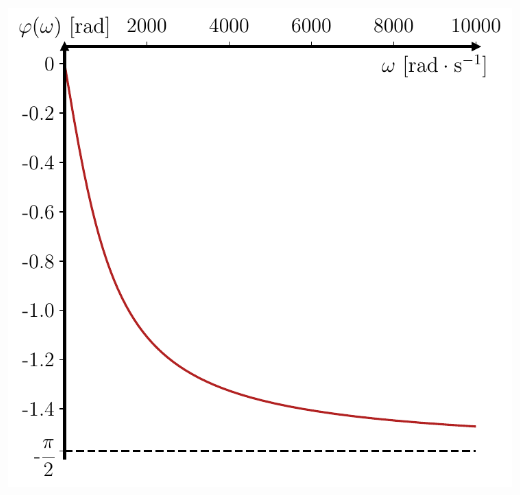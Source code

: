 \documentclass[../../main/main.tex]{subfiles}
\begin{document}
\begin{tcb*}[sidebyside, righthand ratio=.6]
\begin{minipage}[t]{.48\linewidth}
\begin{center}
{			}{%
				\includegraphics[width=\linewidth]{Ucw_arg_prof}
			}%
		\end{center}
	\end{minipage}
\end{tcb*}
\end{document}
